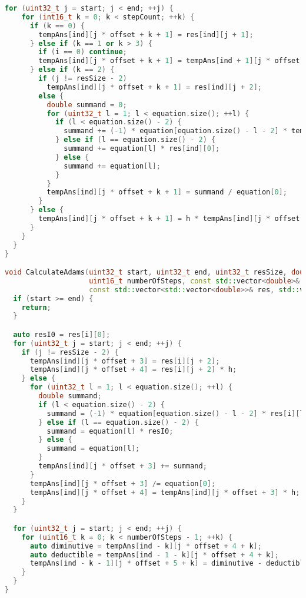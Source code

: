 \documentclass{report}
\begin{document}
\begin{lstlisting}[language=C++,caption=STL версия]
  for (uint32_t j = start; j < end; ++j) {
    for (int16_t k = 0; k < stepCount; ++k) {
      if (k == 0) {
        tempAns[ind][j * offset + k + 1] = res[ind][j + 1];
      } else if (k == 1 or k > 3) {
        if (i == 0) continue;
        tempAns[ind][j * offset + k + 1] = tempAns[ind + 1][j * offset + k] - tempAns[ind][j * offset + k];
      } else if (k == 2) {
        if (j != resSize - 2)
          tempAns[ind][j * offset + k + 1] = res[ind][j + 2];
        else {
          double summand = 0;
          for (uint32_t l = 1; l < equation.size(); ++l) {
            if (l < equation.size() - 2) {
              summand += (-1) * equation[equation.size() - l - 2] * tempAns[ind][(l - 1) * offset + k - 1];
            } else if (l == equation.size() - 2) {
              summand += equation[l] * res[ind][0];
            } else {
              summand += equation[l];
            }
          }
          tempAns[ind][j * offset + k + 1] = summand / equation[0];
        }
      } else {
        tempAns[ind][j * offset + k + 1] = h * tempAns[ind][j * offset + k];
      }
    }
  }
}

void CalculateAdams(uint32_t start, uint32_t end, uint32_t resSize, double h, uint32_t i, uint32_t ind, uint32_t offset,
                    uint16_t numberOfSteps, const std::vector<double>& equation,
                    const std::vector<std::vector<double>>& res, std::vector<std::vector<double>>& tempAns) {
  if (start >= end) {
    return;
  }

  auto resI0 = res[i][0];
  for (uint32_t j = start; j < end; ++j) {
    if (j != resSize - 2) {
      tempAns[ind][j * offset + 3] = res[i][j + 2];
      tempAns[ind][j * offset + 4] = res[i][j + 2] * h;
    } else {
      for (uint32_t l = 1; l < equation.size(); ++l) {
        double summand;
        if (l < equation.size() - 2) {
          summand = (-1) * equation[equation.size() - l - 2] * res[i][l];
        } else if (l == equation.size() - 2) {
          summand = equation[l] * resI0;
        } else {
          summand = equation[l];
        }
        tempAns[ind][j * offset + 3] += summand;
      }
      tempAns[ind][j * offset + 3] /= equation[0];
      tempAns[ind][j * offset + 4] = tempAns[ind][j * offset + 3] * h;
    }
  }

  for (uint32_t j = start; j < end; ++j) {
    for (uint16_t k = 0; k < numberOfSteps - 1; ++k) {
      auto diminutive = tempAns[ind - k][j * offset + 4 + k];
      auto deductible = tempAns[ind - 1 - k][j * offset + 4 + k];
      tempAns[ind - k - 1][j * offset + 5 + k] = diminutive - deductible;
    }
  }
}


\end{lstlisting}
\end{document}
